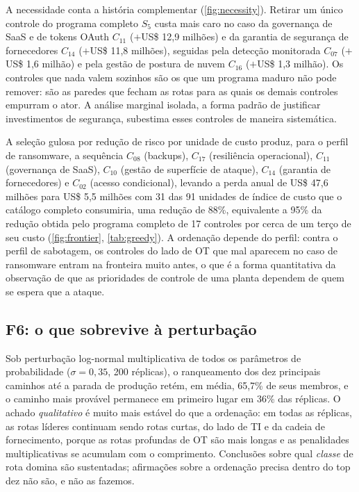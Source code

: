 A necessidade conta a história complementar (\cref{fig:necessity}). Retirar um
único controle do programa completo $S_5$ custa mais caro no caso da governança
de SaaS e de tokens OAuth $C_{11}$ ($+$US\$ 12,9 milhões) e da garantia de
segurança de fornecedores $C_{14}$ ($+$US\$ 11,8 milhões), seguidas pela
detecção monitorada $C_{07}$ ($+$US\$ 1,6 milhão) e pela gestão de postura de
nuvem $C_{16}$ ($+$US\$ 1,3 milhão). Os controles que nada valem sozinhos são
os que um programa maduro não pode remover: são as paredes que fecham as rotas
para as quais os demais controles empurram o ator. A análise marginal isolada, a forma padrão de justificar investimentos de
segurança, subestima esses controles de maneira sistemática.



A seleção gulosa por redução de risco por unidade de custo produz, para o perfil
de ransomware, a sequência $C_{08}$ (backups), $C_{17}$ (resiliência
operacional), $C_{11}$ (governança de SaaS), $C_{10}$ (gestão de superfície de
ataque), $C_{14}$ (garantia de fornecedores) e $C_{02}$ (acesso condicional),
levando a perda anual de US\$ 47,6 milhões para US\$ 5,5 milhões com 31 das 91
unidades de índice de custo que o catálogo completo consumiria, uma redução de 88\%, equivalente a 95\% da redução obtida pelo programa completo de 17
controles por cerca de um terço de seu custo (\cref{fig:frontier},
\cref{tab:greedy}). A ordenação depende do perfil: contra o perfil de sabotagem,
os controles do lado de OT que mal aparecem no caso de ransomware entram na
fronteira muito antes, o que é a forma quantitativa da observação de que as
prioridades de controle de uma planta dependem de quem se espera que a ataque.



\subsection{F6: o que sobrevive à perturbação}

Sob perturbação log-normal multiplicativa de todos os parâmetros de
probabilidade ($\sigma = 0{,}35$, 200 réplicas), o ranqueamento dos dez
principais caminhos até a parada de produção retém, em média, 65,7\% de seus
membros, e o caminho mais provável permanece em primeiro lugar em 36\% das
réplicas. O achado \emph{qualitativo} é muito mais estável do que a ordenação:
em todas as réplicas, as rotas líderes continuam sendo rotas curtas, do lado de
TI e da cadeia de fornecimento, porque as rotas profundas de OT são mais longas
e as penalidades multiplicativas se acumulam com o comprimento. Conclusões
sobre qual \emph{classe} de rota domina são sustentadas; afirmações sobre a
ordenação precisa dentro do top dez não são, e não as fazemos.

